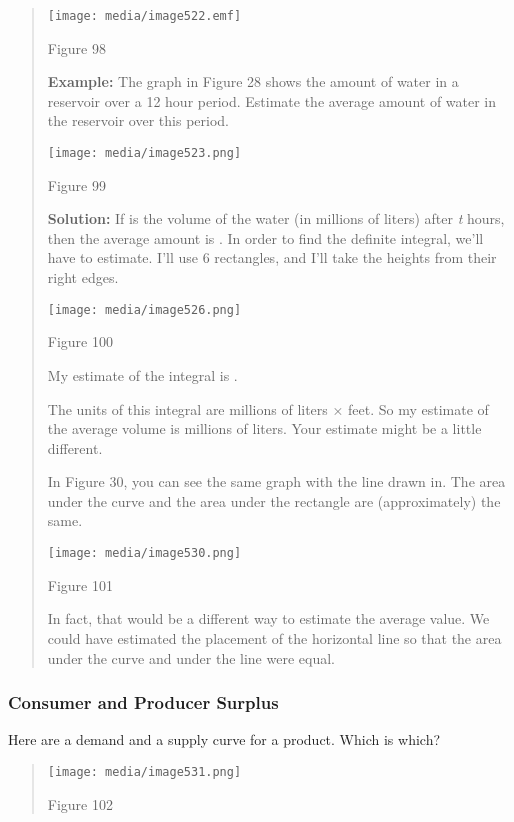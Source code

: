 \begin{quote}
\texttt{[image: media/image522.emf]}

Figure 98

\textbf{Example:} The graph in Figure 28 shows the amount of water in a
reservoir over a 12 hour period. Estimate the average amount of water in
the reservoir over this period.

\texttt{[image: media/image523.png]}

Figure 99

\textbf{Solution:} If is the volume of the water (in millions of liters)
after \emph{t} hours, then the average amount is . In order to find the
definite integral, we'll have to estimate. I'll use 6 rectangles, and
I'll take the heights from their right edges.

\texttt{[image: media/image526.png]}

Figure 100

My estimate of the integral is .

The units of this integral are millions of liters × feet. So my estimate
of the average volume is millions of liters. Your estimate might be a
little different.

In Figure 30, you can see the same graph with the line drawn in. The
area under the curve and the area under the rectangle are
(approximately) the same.

\texttt{[image: media/image530.png]}

Figure 101

In fact, that would be a different way to estimate the average value. We
could have estimated the placement of the horizontal line so that the
area under the curve and under the line were equal.
\end{quote}

\subsubsection{Consumer and Producer
Surplus}\label{consumer-and-producer-surplus}

Here are a demand and a supply curve for a product. Which is which?

\begin{quote}
\texttt{[image: media/image531.png]}

Figure 102
\end{quote}

